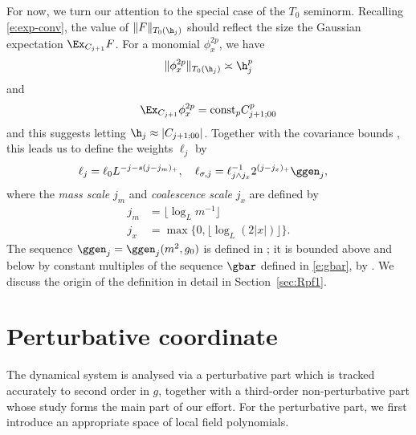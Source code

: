 For now, we turn our attention to the special case of the $T_0$ seminorm. Recalling
\eqref{e:exp-conv}, the value of $\|F\|_{T_0(\h_j)}$ should reflect the size the
Gaussian expectation $\Ex_{C_{j+1}} F$. For a monomial $\phi_x^{2p}$, we have
\begin{equation}
\|\phi_x^{2p}\|_{T_0(\h_j)} \asymp \h_j^p
\end{equation}
and
\begin{equation}
\Ex_{C_{j+1}} \phi_x^{2p} = \mathrm{const}_p C_{j+1;00}^p
\end{equation}
and this suggests letting $\h_j \approx |C_{j+1;00}|$. Together with the covariance
bounds \REF, this leads us to define the weights $\ell_j$ by
\begin{align}
\label{e:elldef-zz}
\ell_j &= \ell_0 L^{-j - s (j - j_m)_+}, \quad
\ell_{\sigma,j}
=
\ell_{j \wedge j_{x}}^{-1} 2^{(j - j_{x})_+} \ggen_j,
\end{align}
where the \emph{mass scale} $j_m$ and \emph{coalescence scale} $j_x$
are defined by
\begin{align}
\label{e:jmdef}
j_m		&= \lfloor\log_{L} m^{-1}\rfloor
	\\
\label{e:jxdef}
j_x 	&= \max\{0,\lfloor \log_{L} (2 |x|)\rfloor\}.
\end{align}
The sequence $\ggen_j = \ggen_j(m^2,g_0)$ is defined in
\cite[\eqref{log-e:ggendef}]{BBS-saw4-log};
it is bounded above and below by constant multiples of
the sequence $\gbar$ defined in
\eqref{e:gbar},
by
\cite[Lemma~\ref{log-lem:gbarmcomp}]{BBS-saw4-log}.
We discuss the origin of the definition  in detail
in Section~\ref{sec:Rpf1}.


\section{Perturbative coordinate}

The dynamical system is analysed via a perturbative part which is tracked accurately
to second order in $g$, together with a third-order non-perturbative part whose study
forms the main part of our effort.  For the perturbative part, we first introduce
an appropriate space of local field polynomials.


